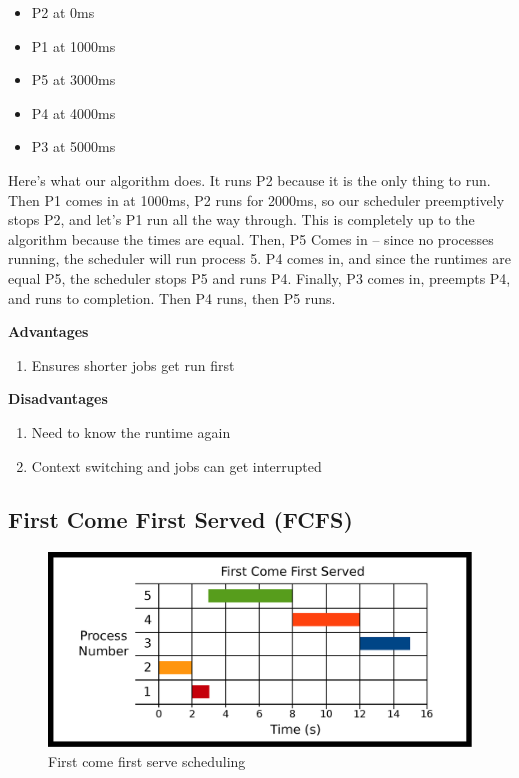 \begin{itemize}
\tightlist
\item
  P2 at 0ms
\item
  P1 at 1000ms
\item
  P5 at 3000ms
\item
  P4 at 4000ms
\item
  P3 at 5000ms
\end{itemize}

Here's what our algorithm does.
It runs P2 because it is the only thing to run.
Then P1 comes in at 1000ms, P2 runs for 2000ms, so our scheduler preemptively stops P2, and let's P1 run all the way through.
This is completely up to the algorithm because the times are equal.
Then, P5 Comes in -- since no processes running, the scheduler will run process 5.
P4 comes in, and since the runtimes are equal P5, the scheduler stops P5 and runs P4.
Finally, P3 comes in, preempts P4, and runs to completion.
Then P4 runs, then P5 runs.

\textbf{Advantages}

\begin{enumerate}
  \item Ensures shorter jobs get run first
\end{enumerate}

\textbf{Disadvantages}

\begin{enumerate}
  \item Need to know the runtime again
  \item Context switching and jobs can get interrupted
\end{enumerate}

\subsection{First Come First Served (FCFS)}

\begin{figure}[H]
\centering
\includegraphics[width=\textwidth]{scheduling/drawings/fcfs.eps}
\caption{First come first serve scheduling}
\end{figure}

